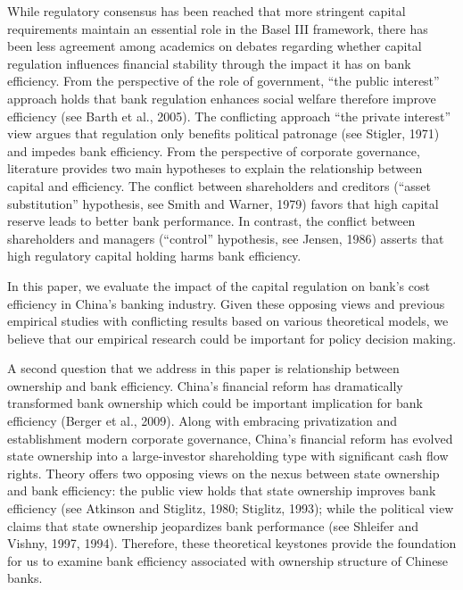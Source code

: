 \documentclass[
  12pt,
  a4paper,
]{scrreprt}
\begin{document}
{{{{While regulatory consensus has been reached that more stringent capital
requirements maintain an essential role in the Basel III framework,
there has been less agreement among academics on debates regarding
whether capital regulation influences financial stability through the
impact it has on bank efficiency. From the perspective of the role of
government, ``the public interest'' approach holds that bank regulation
enhances social welfare therefore improve efficiency (see Barth et al.,
2005). The conflicting approach ``the private interest'' view argues
that regulation only benefits political patronage (see Stigler, 1971)
and impedes bank efficiency. From the perspective of corporate
governance, literature provides two main hypotheses to explain the
relationship between capital and efficiency. The conflict between
shareholders and creditors (``asset substitution'' hypothesis, see Smith
and Warner, 1979) favors that high capital reserve leads to better bank
performance. In contrast, the conflict between shareholders and managers
(``control'' hypothesis, see Jensen, 1986) asserts that high regulatory
capital holding harms bank efficiency.

In this paper, we evaluate the impact of the capital regulation on
bank's cost efficiency in China's banking industry. Given these opposing
views and previous empirical studies with conflicting results based on
various theoretical models, we believe that our empirical research could
be important for policy decision making.

A second question that we address in this paper is relationship between
ownership and bank efficiency. China's financial reform has dramatically
transformed bank ownership which could be important implication for bank
efficiency (Berger et al., 2009). Along with embracing privatization and
establishment modern corporate governance, China's financial reform has
evolved state ownership into a large-investor shareholding type with
significant cash flow rights. Theory offers two opposing views on the
nexus between state ownership and bank efficiency: the public view holds
that state ownership improves bank efficiency (see Atkinson and
Stiglitz, 1980; Stiglitz, 1993); while the political view claims that
state ownership jeopardizes bank performance (see Shleifer and Vishny,
1997, 1994). Therefore, these theoretical keystones provide the
foundation for us to examine bank efficiency associated with ownership
structure of Chinese banks.

}}}}
\end{document}
